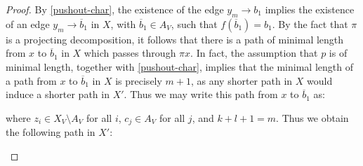 \begin{proof}
By \cref{pushout-char}, the existence of the edge $y_m \to b_1$ implies the existence of an edge $y_m \to \overline{b}_1$ in $X$, with $\overline{b}_1 \in A_V$, such that $f(\overline{b}_1) = b_1$. By the fact that $\pi$ is a projecting decomposition, it follows that there is a path of minimal length from $x$ to $\overline{b}_1$ in $X$ which passes through $\pi x$. In fact, the assumption that $p$ is of minimal length, together with \cref{pushout-char}, implies that the minimal length of a path from $x$ to $\overline{b}_1$ in $X$ is precisely $m+1$, as any shorter path in $X$ would induce a shorter path in $X'$. Thus we may write this path from $x$ to $\overline{b}_1$ as:

\begin{figure}[H]
    \centering
\end{figure}

where $z_i \in X_V \setminus A_V$ for all $i$, $c_j \in A_V$ for all $j$, and $k+l+1 = m$. Thus we obtain the following path in $X'$:

\begin{figure}[H]
    \centering
\end{figure}
\end{proof}
